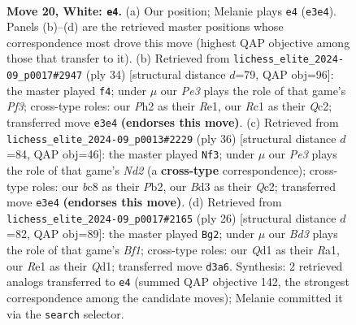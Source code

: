 \documentclass[11pt]{article}
\begin{document}
\begin{figure}[p]
\label{fig:thought-m36}
\end{figure}

\clearpage

\begin{figure}[p]\centering
\begin{subfigure}{0.46\textwidth}\centering
\resizebox{\linewidth}{!}{%
\newchessgame
\chessboard[
  setfen={r1b3k1/pp1n3p/2pqr1p1/3p2p1/3P4/2NBPPP1/PP3K1P/2RQR3 w - - 3 20},
  showmover=false,
  pgfstyle=straightmove, color=movearrow, markmove={e3-e4}
]}
\caption{}
\end{subfigure}\hfill
\begin{subfigure}{0.46\textwidth}\centering
\resizebox{\linewidth}{!}{%
\newchessgame
\chessboard[
  setfen={r1b1rn1k/1p3pp1/p1p2q1p/3p4/3P4/2NBPP2/PPQ3PP/4RRK1 w - - 1 18},
  showmover=false,
  pgfstyle=straightmove, color=movearrow, markmove={f3-f4}
]}
\caption{}
\end{subfigure}
\\[4pt]
\begin{subfigure}{0.46\textwidth}\centering
\resizebox{\linewidth}{!}{%
\newchessgame
\chessboard[
  setfen={r1br4/1p3pkp/n1p2pp1/q7/p1PPB3/P6P/1PQN1PP1/3RR1K1 w - - 6 19},
  showmover=false,
  pgfstyle=straightmove, color=movearrow, markmove={d2-f3}
]}
\caption{}
\end{subfigure}\hfill
\begin{subfigure}{0.46\textwidth}\centering
\resizebox{\linewidth}{!}{%
\newchessgame
\chessboard[
  setfen={r1b1k2r/p4p2/n1p1pq2/1p6/2pP4/2N3P1/PP3P1P/R2QKB1R w KQkq - 1 14},
  showmover=false,
  pgfstyle=straightmove, color=movearrow, markmove={f1-g2}
]}
\caption{}
\end{subfigure}
\caption{\textbf{Move 20, White: \texttt{e4}.} (a) Our position; Melanie plays \texttt{e4} (\texttt{e3e4}). Panels (b)--(d) are the retrieved master positions whose correspondence most drove this move (highest QAP objective among those that transfer to it). (b) Retrieved from \texttt{lichess\_elite\_2024-09\_p0017\#2947} (ply 34) [structural distance $d$=79, QAP obj=96]: the master played \texttt{f4}; under $\mu$ our \emph{Pe3} plays the role of that game's \emph{Pf3}; cross-type roles: our \emph{P}h2 as their \emph{R}e1, our \emph{R}c1 as their \emph{Q}c2; transferred move \texttt{e3e4} \textbf{(endorses this move)}. (c) Retrieved from \texttt{lichess\_elite\_2024-09\_p0013\#2229} (ply 36) [structural distance $d$=84, QAP obj=46]: the master played \texttt{Nf3}; under $\mu$ our \emph{Pe3} plays the role of that game's \emph{Nd2} (a \textbf{cross-type} correspondence); cross-type roles: our \emph{b}c8 as their \emph{P}b2, our \emph{B}d3 as their \emph{Q}c2; transferred move \texttt{e3e4} \textbf{(endorses this move)}. (d) Retrieved from \texttt{lichess\_elite\_2024-09\_p0017\#2165} (ply 26) [structural distance $d$=82, QAP obj=89]: the master played \texttt{Bg2}; under $\mu$ our \emph{Bd3} plays the role of that game's \emph{Bf1}; cross-type roles: our \emph{Q}d1 as their \emph{R}a1, our \emph{R}e1 as their \emph{Q}d1; transferred move \texttt{d3a6}. Synthesis: 2 retrieved analogs transferred to \texttt{e4} (summed QAP objective 142, the strongest correspondence among the candidate moves); Melanie committed it via the \texttt{search} selector.}

\end{figure}
\end{document}
